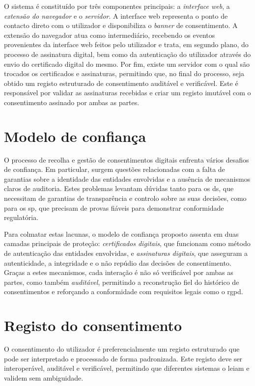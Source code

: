 O sistema é constituído por três componentes principais: a \textit{interface web}, a \textit{extensão do navegador} e o \textit{servidor}.
A interface web representa o ponto de contacto direto com o utilizador e disponibiliza o \textit{banner} de consentimento.
A extensão do navegador atua como intermediário, recebendo os eventos provenientes da interface web feitos pelo utilizador e trata, em segundo plano, do processo de assinatura digital, bem como da autenticação do utilizador através do envio do certificado digital do mesmo.
Por fim, existe um servidor com o qual são trocados os certificados e assinaturas, permitindo que, no final do processo, seja obtido um registo estruturado de consentimento auditável e verificável. Este é responsável por validar as assinaturas recebidas e criar um registo imutável com o consentimento assinado por ambas as partes.

\section{Modelo de confiança}

O processo de recolha e gestão de consentimentos digitais enfrenta vários desafios de confiança.
Em particular, surgem questões relacionadas com a falta de garantias sobre a identidade das entidades envolvidas e a ausência de mecanismos claros de auditoria. 
Estes problemas levantam dúvidas tanto para os \acrshort{ds}, que necessitam de garantias de transparência e controlo sobre as suas decisões, como para os \acrshort{sp}, que precisam de provas fiáveis para demonstrar conformidade regulatória.

Para colmatar estas lacunas, o modelo de confiança proposto assenta em duas camadas principais de proteção: 
\textit{certificados digitais}, que funcionam como método de autenticação das entidades envolvidas, e \textit{assinaturas digitais}, que asseguram a autenticidade, a integridade e o não repúdio das decisões de consentimento. 
Graças a estes mecanismos, cada interação é não só verificável por ambas as partes, como também \textit{auditável}, permitindo a reconstrução fiel do histórico de consentimentos e reforçando a conformidade com requisitos legais como o \acrshort{rgpd}.

\section{Registo do consentimento}

O consentimento do utilizador é preferencialmente um registo estruturado que pode ser interpretado e processado de forma padronizada. Este registo deve ser interoperável, auditável e verificável, permitindo que diferentes sistemas o leiam e validem sem ambiguidade.

